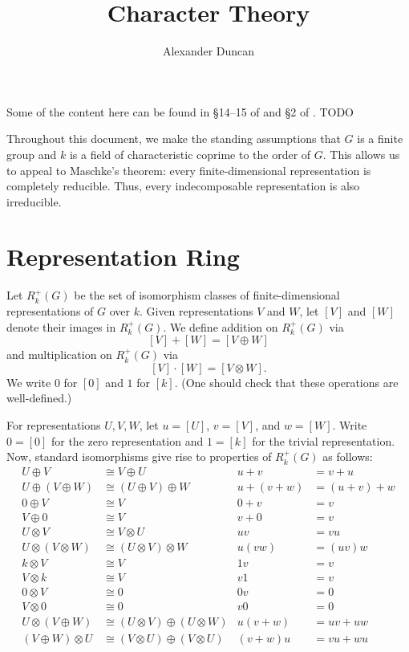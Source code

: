 \documentclass[12pt]{article}
\theoremstyle{plain}
\theoremstyle{definition}
\theoremstyle{remark}
\numberwithin{equation}{section}
\begin{document}
\title{Character Theory}
\author{Alexander Duncan}

\maketitle

Some of the content here can be found in
\S 14--15 of \cite{AlperinBell} and
\S 2 of \cite{Serre}.
TODO

Throughout this document, we make the standing assumptions that $G$
is a finite group and $k$ is a field of characteristic coprime to the
order of $G$.
This allows us to appeal to Maschke's theorem:
every finite-dimensional representation is completely reducible.
Thus, every indecomposable representation is also irreducible.

\section{Representation Ring}

Let $R^+_k(G)$ be the set of isomorphism classes of
finite-dimensional representations of $G$ over $k$.
Given representations $V$ and $W$, let $[V]$ and $[W]$ denote their
images in $R^+_k(G)$.
We define addition on $R^+_k(G)$ via
\[ [V] + [W] = [V \oplus W] \]
and multiplication on $R^+_k(G)$ via
\[ [V] \cdot [W] = [V \otimes W]. \]
We write $0$ for $[0]$ and $1$ for $[k]$.
(One should check that these operations are well-defined.)

For representations $U,V,W$, let $u=[U]$, $v=[V]$, and $w=[W]$.
Write $0 = [0]$ for the zero representation and $1=[k]$
for the trivial representation.
Now, standard isomorphisms give rise to properties of $R^+_k(G)$ as follows:
\begin{align*}
U \oplus V &\cong V \oplus U & u+v&=v+u\\
U \oplus (V \oplus W) &\cong (U \oplus V) \oplus W & u+(v+w)&=(u+v)+w\\
0 \oplus V &\cong V & 0+v&=v\\
V \oplus 0 &\cong V & v+0&=v\\
U \otimes V &\cong V \otimes U & uv&=vu\\
U \otimes (V \otimes W) &\cong (U \otimes V) \otimes W & u(vw)&=(uv)w\\
k \otimes V &\cong V & 1v&=v\\
V \otimes k &\cong V & v1&=v\\
0 \otimes V &\cong 0 & 0v&=0\\
V \otimes 0 &\cong 0 & v0&=0\\
U \otimes (V \oplus W) &\cong (U \otimes V) \oplus (U \otimes W) &
u(v+w)&=uv+uw\\
(V \oplus W) \otimes U &\cong (V \otimes U) \oplus (V \otimes U) &
(v+w)u&=vu+wu
\end{align*}
\end{document}
